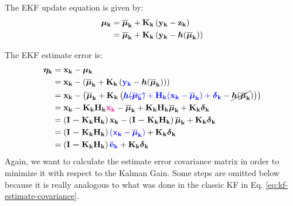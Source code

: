 \documentclass[12pt]{article}
\begin{document}
The EKF update equation is given by:
\begin{equation}
\begin{aligned}
    \boldsymbol{\mathbf{\mu_k}} &= \boldsymbol{\mathbf{\overline{\mu}_k}} + \boldsymbol{\mathbf{K_k}}\left(\boldsymbol{\mathbf{y_k}} - \boldsymbol{\mathbf{z_k}}\right)\\
    &= \boldsymbol{\mathbf{\overline{\mu}_k}} + \boldsymbol{\mathbf{K_k}}\left(
        \boldsymbol{\mathbf{y_k}} - {\boldsymbol{h}}(\boldsymbol{\mathbf{\overline{\mu}_k}})\right)\\
    \label{eq:ekf-update}
\end{aligned}
\end{equation}

The EKF estimate error is:
\begin{equation}
\begin{aligned}
    \boldsymbol{\mathbf{\eta_k}} &= \boldsymbol{\mathbf{x_k}} - \boldsymbol{\mathbf{\mu_k}}\\
    &= \boldsymbol{\mathbf{x_k}} - \left(\boldsymbol{\mathbf{\overline{\mu}_k}} + 
    \boldsymbol{\mathbf{K_k}}\left(\color{blue}\boldsymbol{\mathbf{y_k}}\color{black}
        - {\boldsymbol{h}}(\boldsymbol{\mathbf{\overline{\mu}_k}})\right)\right)\\
    &= \boldsymbol{\mathbf{x_k}} - \left(\boldsymbol{\mathbf{\overline{\mu}_k}} 
    + \boldsymbol{\mathbf{K_k}}\left(\color{blue}\cancel{{\boldsymbol{h}}(
        \boldsymbol{\mathbf{\overline{\mu}_k}})} + \boldsymbol{\mathbf{H_k}}(\boldsymbol{\mathbf{x_k}} 
        - \boldsymbol{\mathbf{\overline{\mu}_k}}) 
        + {\boldsymbol{\delta}}_\mathbf{k}\color{black} 
        - \cancel{{\boldsymbol{h}}(\boldsymbol{\mathbf{\overline{\mu}_k}}})\right)\right)\\
    &= \boldsymbol{\mathbf{x_k}} - \boldsymbol{\mathbf{K_k H_k}} \color{magenta}\boldsymbol{\mathbf{x_k}}\color{black}
    - \boldsymbol{\mathbf{\overline{\mu}_k}} + \boldsymbol{\mathbf{K_k H_k}}
    \boldsymbol{\mathbf{\overline{\mu}_k}} + \boldsymbol{\mathbf{K_k}} {\boldsymbol{\delta}}_\mathbf{k}\\
    &= \left(\boldsymbol{\mathbf{I - K_k H_k}}\right)\boldsymbol{\mathbf{x_k}} 
    -\left(\boldsymbol{\mathbf{I - K_k H_k}}\right)\boldsymbol{\mathbf{\overline{\mu}_k}}
    + \boldsymbol{\mathbf{K_k}} {\boldsymbol{\delta}}_\mathbf{k}\\
    &= \left(\boldsymbol{\mathbf{I - K_k H_k}}\right) \color{blue}(\boldsymbol{\mathbf{x_k}} 
    - \boldsymbol{\mathbf{\overline{\mu}_k}})\color{black} 
    + \boldsymbol{\mathbf{K_k}} {\boldsymbol{\delta}}_\mathbf{k}\\
    &= \left(\boldsymbol{\mathbf{I - K_k H_k}}\right) \color{blue}\boldsymbol{\mathbf{\bar{e}_k}}\color{black} 
    + \boldsymbol{\mathbf{K_k}} {\boldsymbol{\delta}}_\mathbf{k}
\end{aligned}
\end{equation}
Again, we want to calculate the estimate error covariance matrix in 
order to minimize it with respect to the Kalman Gain. Some steps are
omitted below because it is really analogous to what was done in the
classic KF in Eq. \ref{eq:kf-estimate-covariance}.
\end{document}
